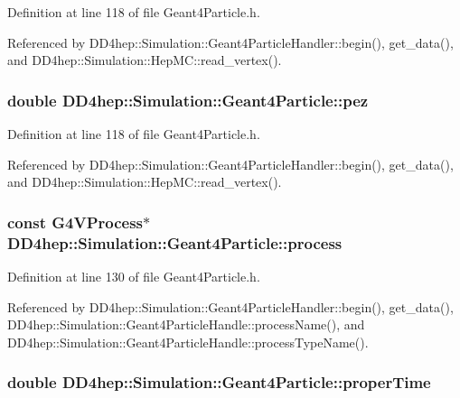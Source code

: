 Definition at line 118 of file Geant4Particle.h.

Referenced by DD4hep::Simulation::Geant4ParticleHandler::begin(), get\_\-data(), and DD4hep::Simulation::HepMC::read\_\-vertex().\hypertarget{class_d_d4hep_1_1_simulation_1_1_geant4_particle_a83de70580c139f049a057c0e185812d1}{
\subsubsection[{pez}]{\setlength{\rightskip}{0pt plus 5cm}double {\bf DD4hep::Simulation::Geant4Particle::pez}}}
\label{class_d_d4hep_1_1_simulation_1_1_geant4_particle_a83de70580c139f049a057c0e185812d1}


Definition at line 118 of file Geant4Particle.h.

Referenced by DD4hep::Simulation::Geant4ParticleHandler::begin(), get\_\-data(), and DD4hep::Simulation::HepMC::read\_\-vertex().\hypertarget{class_d_d4hep_1_1_simulation_1_1_geant4_particle_abe2efb370153a1466b9fa5dd61a04f9a}{
\subsubsection[{process}]{\setlength{\rightskip}{0pt plus 5cm}const G4VProcess$\ast$ {\bf DD4hep::Simulation::Geant4Particle::process}}}
\label{class_d_d4hep_1_1_simulation_1_1_geant4_particle_abe2efb370153a1466b9fa5dd61a04f9a}


Definition at line 130 of file Geant4Particle.h.

Referenced by DD4hep::Simulation::Geant4ParticleHandler::begin(), get\_\-data(), DD4hep::Simulation::Geant4ParticleHandle::processName(), and DD4hep::Simulation::Geant4ParticleHandle::processTypeName().\hypertarget{class_d_d4hep_1_1_simulation_1_1_geant4_particle_a8799faf00417956ea2f814ee2ad086ee}{
\subsubsection[{properTime}]{\setlength{\rightskip}{0pt plus 5cm}double {\bf DD4hep::Simulation::Geant4Particle::properTime}}}
\label{class_d_d4hep_1_1_simulation_1_1_geant4_particle_a8799faf00417956ea2f814ee2ad086ee}


